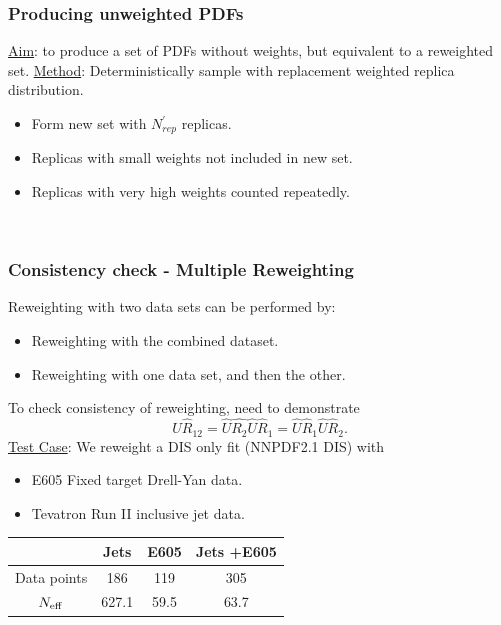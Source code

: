 \documentclass[10pt]{beamer}
\newcommand{\be}{\begin{equation*}}
\newcommand{\ee}{\end{equation*}}
\newcommand{\vso}{\vskip15pt}
\begin{document}
\begin{frame}
\frametitle{Producing unweighted PDFs}
  \small \underline{Aim}: to produce a set of PDFs without weights, but equivalent to a reweighted set. 
\vso
\underline{Method}: Deterministically sample with replacement weighted replica distribution.
\begin{itemize}
		\item<1-> Form new set with $N_{rep}^\prime$ replicas.
		\item<1-> Replicas with small weights not included in new set.
		\item<1-> Replicas with very high weights counted repeatedly.
\end{itemize}
\vso
{}
\vso
{}\\
\end{frame}

\begin{frame}
\frametitle{Consistency check - Multiple Reweighting}
Reweighting with two data sets can be performed by:
\begin{itemize}
		\item<1-> Reweighting with the combined dataset.
		\item<1-> Reweighting with one data set, and then the other.
\end{itemize}
\vso
To check consistency of reweighting, need to demonstrate
\be    \hat{U}\hat{R}_{12} = \hat{U}\hat{R_2}\hat{U} \hat{R}_1 = \hat{U}\hat{R}_1 \hat{U}\hat{R}_2. \ee
\vso
\underline{Test Case}: We reweight a DIS only fit (NNPDF2.1 DIS) with
\begin{itemize}
		\item<1-> E605 Fixed target Drell-Yan data.
		\item<1-> Tevatron Run II inclusive jet data.
\end{itemize}

\begin{table}[t]
  \centering
  \begin{tabular}[c]{|c|c|c|c|}
    \hline
    & Jets & E605 & Jets +E605 \\
    \hline
    Data points & 186 & 119 & 305 \\
    \hline
    $N_{\rm eff}$ & 627.1 & 59.5 & 63.7\\
    \hline
  \end{tabular}
\end{table}

\end{frame}
\end{document}
